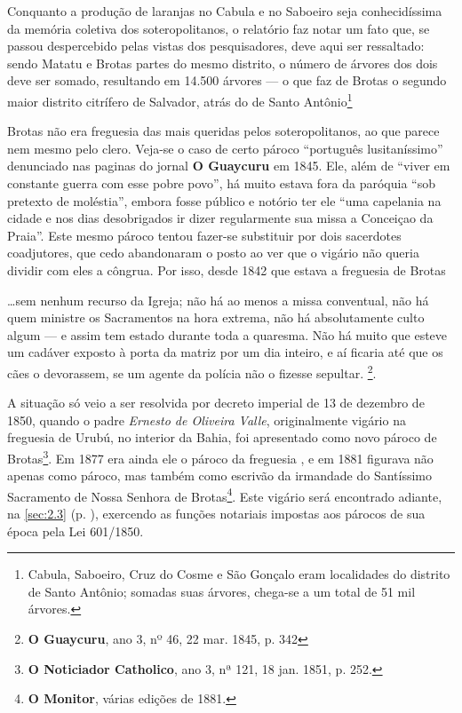 Conquanto a produção de laranjas no Cabula e no Saboeiro seja conhecidíssima da memória coletiva dos soteropolitanos, o relatório faz notar um fato que, se passou despercebido pelas vistas dos pesquisadores, deve aqui ser ressaltado: sendo Matatu e Brotas partes do mesmo distrito, o número de árvores dos dois deve ser somado, resultando em 14.500 árvores --- o que faz de Brotas o segundo maior distrito citrífero de Salvador, atrás do de Santo Antônio\footnote{Cabula, Saboeiro, Cruz do Cosme e São Gonçalo eram localidades do distrito de Santo Antônio; somadas suas árvores, chega-se a um total de 51 mil árvores.}

Brotas não era freguesia das mais queridas pelos soteropolitanos, ao que parece nem mesmo pelo clero. Veja-se o caso de certo pároco ``português lusitaníssimo'' denunciado nas paginas do jornal \textbf{O Guaycuru} em 1845. Ele, além de ``viver em constante guerra com esse pobre povo'', há muito estava fora da paróquia ``sob pretexto de moléstia'', embora fosse público e notório ter ele ``uma capelania na cidade e nos dias desobrigados ir dizer regularmente sua missa a Conceiçao da Praia''. Este mesmo pároco tentou fazer-se substituir por dois sacerdotes coadjutores, que cedo abandonaram o posto ao ver que o vigário não queria dividir com eles a côngrua. Por isso, desde 1842 que estava a freguesia de Brotas 

\begin{citacao}
\dots sem nenhum recurso da Igreja; não há ao menos a missa conventual, não há quem ministre os Sacramentos na hora extrema, não há absolutamente culto algum --- e assim tem estado durante toda a quaresma. Não há muito que esteve um cadáver exposto à porta da matriz por um dia inteiro, e aí ficaria até que os cães o devorassem, se um agente da polícia não o fizesse sepultar. \footnote{\textbf{O Guaycuru}, ano 3, nº 46, 22 mar. 1845, p. 342}. 
\end{citacao}

A situação só veio a ser resolvida por decreto imperial de 13 de dezembro de 1850, quando o padre \textit{Ernesto de Oliveira Valle}, originalmente vigário na freguesia de Urubú, no interior da Bahia, foi apresentado como novo pároco de Brotas\footnote{\textbf{O Noticiador Catholico}, ano 3, nª 121, 18 jan. 1851, p. 252.}. Em 1877 era ainda ele o pároco da freguesia \cite[p.~176]{macosta_almana_1877}, e em 1881 figurava não apenas como pároco, mas também como escrivão da irmandade do Santíssimo Sacramento de Nossa Senhora de Brotas\footnote{\textbf{O Monitor}, várias edições de 1881.}. Este vigário será encontrado adiante, na \autoref{sec:2.3} (p. \pageref{sec:2.3}), exercendo as funções notariais impostas aos párocos de sua época pela Lei 601/1850.